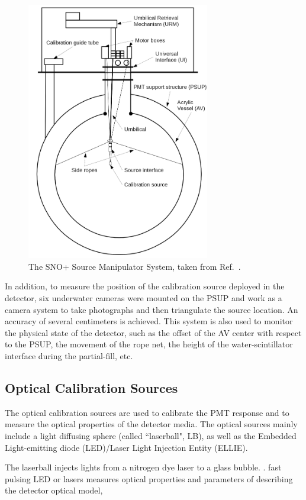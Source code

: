\begin{figure}[!htb]
	\centering
	\includegraphics[width=8cm]{SMS.png}
	\caption{The SNO+ Source Manipulator System, taken from Ref.~\cite{snop_jinst}.}
	\label{sms}
\end{figure}

In addition, to measure the position of the calibration source deployed in the detector, six underwater cameras were mounted on the PSUP and work as a camera system to take photographs and then triangulate the source location. An accuracy of several centimeters is achieved. This system is also used to monitor the physical state of the detector, such as the offset of the AV center with respect to the PSUP, the movement of the rope net, the height of the water-scintillator interface during the partial-fill, etc\cite{singh2020underwater,snop_jinst}.

\subsection{Optical Calibration Sources}
The optical calibration sources are used to calibrate the PMT response and to measure the optical properties of the detector media. The optical sources mainly include a light diffusing sphere (called ``laserball", LB), as well as the Embedded Light-emitting diode (LED)/Laser Light Injection Entity (ELLIE)\cite{snop_jinst}.

The laserball injects lights from a nitrogen dye laser to a glass bubble.
\cite{anderson2021optical}.
fast pulsing LED or lasers
measures optical properties and parameters of describing the detector optical model,

